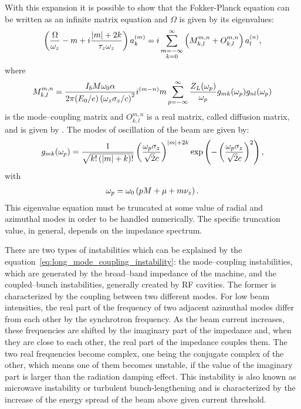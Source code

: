     With this expansion it is possible to show that the Fokker-Planck equation can be written as an infinite matrix equation and $\Omega$ is given by its eigenvalues:
    \begin{align}\label{eq:long_mode_coupling_instability}
        \left(\frac{\Omega}{\omega_z}-m +
             i\frac{|m|+2k}{\tau_z\omega_z}\right)a_k^{(m)} =
        i\sum_{\substack{m=-\infty\\k=0}}^{\infty}\left(
                    M^{m,n}_{k,l}+O^{m,n}_{k,l}\right)a_l^{(n)},
    \end{align}
    where
    \begin{align}
        M^{m,n}_{k,l} =
        \frac{I_bM\omega_0\alpha}{2\pi(E_0/e)\left(\omega_z\sigma_z/c\right)^2}
        i^{(m-n)}m\sum_{p=-\infty}^{\infty}
                \frac{Z_L(\omega_p)}{\omega_p} g_{mk}(\omega_p) g_{nl}(\omega_p)
    \end{align}
    is the mode--coupling matrix and $O^{m,n}_{k,l}$ is a real matrix, called diffusion matrix, and is given by . The modes of oscillation of the beam are given by:
    \begin{align}\label{eq:gaussian_oscillation_modes}
        g_{mk}(\omega_p) = \frac{1}{\sqrt{k!\left(|m|+k\right)!}}
        \left(\frac{\omega_p\sigma_z}{\sqrt{2}c}\right)^{|m| + 2k}
        \exp\left(-\left(\frac{\omega_p\sigma_z}{\sqrt{2}c}\right)^2\right),
    \end{align}
    with
    \begin{align}
        \omega_p = \omega_0\left(pM + \mu + m\nu_z\right).
    \end{align}
    This eigenvalue equation must be truncated at some value of radial and azimuthal modes in order to be handled numerically. The specific truncation value, in general, depends on the impedance spectrum.

    There are two types of instabilities which can be explained by the equation~\eqref{eq:long_mode_coupling_instability}: the mode--coupling instabilities, which are generated by the broad--band impedance of the machine, and the coupled--bunch instabilities, generally created by RF cavities. The former is characterized by the coupling between two different modes. For low beam intensities, the real part of the frequency of two adjacent azimuthal modes differ from each other by the synchrotron frequency. As the beam current increases, these frequencies are shifted by the imaginary part of the impedance and, when they are close to each other, the real part of the impedance couples them. The two real frequencies become complex, one being the conjugate complex of the other, which means one of them becomes unstable, if the value of the imaginary part is larger than the radiation damping effect. This instability is also known as microwave instability or turbulent bunch-lengthening and is characterized by the increase of the energy spread of the beam above given current threshold.

